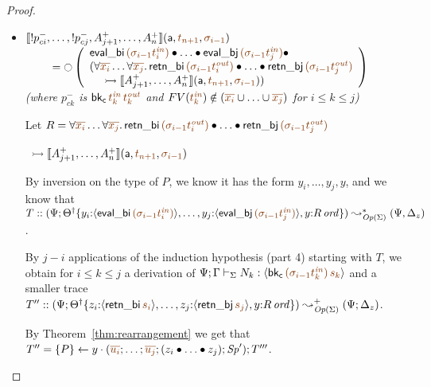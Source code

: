 \begin{proof}
\begin{itemize}
\item $\opbasic{{!}p^-_{ci},\ldots,{!}p^-_{cj},A^+_{j+1},\ldots,A^+_n}{t_{n+1}}{\sigma_{i-1}}$
  \\
  $~ \qquad = {\ocircle}\left(
    \begin{array}{l}
       {\sf eval\_bi}\,\lf{({\sigma_{i-1}}t^{\it in}_i)} 
                    \fuse  \ldots \fuse
                 {\sf eval\_bj}\,\lf{({\sigma_{i-1}}t^{\it in}_j)} \fuse ~
       \\
       (\forall\lf{\overline{x_i}}\ldots\forall\lf{\overline{x_j}}.\, 
          {\sf retn\_bi}\,\lf{(\sigma_{i-1}{t^{\it out}_i})}
          \fuse \ldots \fuse 
       {\sf retn\_bj}\,\lf{(\sigma_{i-1}{t^{\it out}_j})}
       \\
       ~\quad
       \lefti \opbasic{A^+_{j+1},\ldots,A^+_n}{t_{n+1}}{\sigma_{i-1}})
    \end{array} \right)$\\
  {\it (where
   $p^-_{ck}$ is ${\sf bk_c}\,\lf{t^{\it in}_k}\,\lf{t^{\it out}_k}$ 
   and $FV(\lf{t_k^{\it in}}) \notin (\lf{\overline{x_i}} \cup \ldots \cup \lf{\overline{x_j}})$ 
   for $i \leq k \leq j$)}

  \bigskip
  Let $R = \forall\lf{\overline{x_i}}\ldots\forall\lf{\overline{x_j}}.\, 
     {\sf retn\_bi}\,\lf{(\sigma_{i-1}{t^{\it out}_i})}
     \fuse \ldots \fuse 
     {\sf retn\_bj}\,\lf{(\sigma_{i-1}{t^{\it out}_j})}$

   ~\qquad\qquad\qquad\qquad\quad $\lefti \opbasic{A^+_{j+1},\ldots,A^+_n}{t_{n+1}}{\sigma_{i-1}}$

  \smallskip
  By inversion on the type of $P$, we know it has the form 
  $y_i, \ldots, y_j, y$, and we know that
  $T :: (\Psi; \tackon{\opsubst{\Theta}}
     {y_i{:}\susp{{\sf eval\_bi}\,\lf{({\sigma_{i-1}}t^{\it in}_i)}}, \ldots,
      y_j{:}\susp{{\sf eval\_bj}\,\lf{({\sigma_{i-1}}t^{\it in}_j)}},
      y{:}\istrue{R}})
    \leadsto^*_{\transop{\Sigma}} (\Psi, \Delta_z)$. 

  \smallskip
  By $j - i$ applications of the induction hypothesis
  (part 4) starting with $T$, we obtain for $i \leq k \leq j$
  a derivation of 
  $\slst{\Sigma}{\Psi}{\Gamma}{N_k}{\susp{{\sf bk_c}\,\lf{(\sigma_{i-1} t^{\it in}_k)\,\lf{s_k}}}}$
  and a smaller trace 
  $T'' :: (\Psi; \tackon{\opsubst{\Theta}}
     {z_i{:}\susp{{\sf retn\_bi}\,\lf{s_i}}, \ldots,
      z_j{:}\susp{{\sf retn\_bj}\,\lf{s_j}},
      y{:}\istrue{R}})
    \leadsto^+_{\transop{\Sigma}}
    (\Psi; \Delta_z)$.

  \smallskip
  By Theorem~\ref{thm:rearrangement}
  we get that 
  $T'' = \tstep{P}{y}
            {(\lf{\overline{u_i}}; \ldots; \lf{\overline{u_j}};
             (\tfuser{z_i}{\tfuser{\ldots}{z_j}}); \Sp')}; T'''$.


\end{itemize}
\end{proof}
